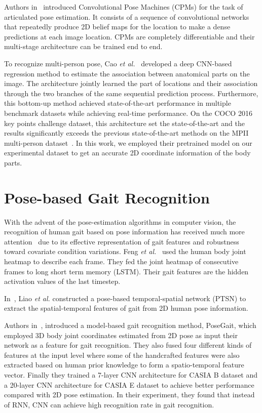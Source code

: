 Authors in~\cite{Wei_16} introduced Convolutional Pose Machines (CPMs) for the task of articulated pose estimation. It consists of a sequence of convolutional networks that repeatedly produce 2D belief maps for the location to make a dense predictions at each image location. CPMs are completely differentiable and their multi-stage architecture can be trained end to end. 

To recognize multi-person pose, Cao \textit{et al.}~\cite{Cao_19} developed a deep CNN-based regression method to estimate the association between anatomical parts on the image. The architecture jointly learned the part of locations and their association through the two branches of the same sequential prediction process. Furthermore, this bottom-up method achieved state-of-the-art performance in multiple benchmark datasets while achieving real-time performance. On the COCO 2016 key points challenge dataset, this architecture set the state-of-the-art and the results significantly exceeds the previous state-of-the-art methods on the MPII multi-person dataset~\cite{Cai_16}. In this work, we employed their pretrained model on our experimental dataset to get an accurate 2D coordinate information of the body parts. 


\section{Pose-based Gait Recognition} \label{sec:pose_based_gait_rec}
With the advent of the pose-estimation algorithms in computer vision, the recognition of human gait based on pose information has received much more attention~\cite{Feng_16, Liao_17, Liao_19} due to its effective representation of gait features and robustness toward covariate condition variations. Feng \textit{et al.}~\cite{Feng_16} used the human body joint heatmap to describe each frame. They fed the joint heatmap of consecutive frames to long short term memory (LSTM). Their gait features are the hidden activation values of the last timestep. 

In~\cite{Liao_17}, Liao \textit{et al.} constructed a pose-based temporal-spatial network (PTSN) to extract the spatial-temporal features of gait from 2D human pose information. 

Authors in~\cite{Liao_19}, introduced a model-based gait recognition method, PoseGait, which employed 3D body joint coordinates estimated from 2D pose as input their network as a feature for gait recognition. They also fused four different kinds of features at the input level where some of the handcrafted features were also extracted based on human prior knowledge to form a spatio-temporal feature vector. Finally they trained a 7-layer CNN architecture for CASIA B dataset and a 20-layer CNN architecture for CASIA E dataset to achieve better performance compared with 2D pose estimation. In their experiment, they found that instead of RNN, CNN can achieve high recognition rate in gait recognition.

